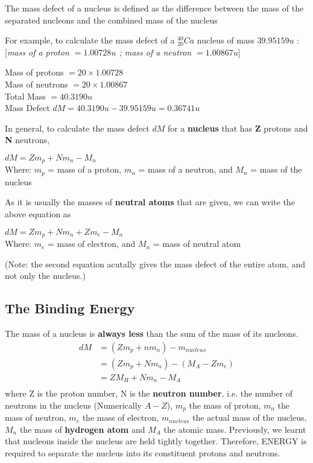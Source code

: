 \begin{defi}
The mass defect of a nucleus is defined as the difference between the mass of the separated nucleons and the combined mass of the nucleus
\end{defi}

For example, to calculate the mass defect of a $^{40}_{20}Ca$ nucleus of mass $39.95159u$ : [\textit{mass of a proton $= 1.00728u$ ; mass of a neutron $= 1.00867 u$}]

\begin{center}
Mass of protons $= 20 \times 1.00728$\\
Mass of neutrons $= 20 \times 1.00867$\\
Total Mass $=40.3190u$\\
Mass Defect $d M = 40.3190u - 39.95159u = 0.36741u$
\end{center}
In general, to calculate the mass defect $d M$ for a \textbf{nucleus} that has \textbf{Z} protons and \textbf{N} neutrons,
\begin{form}
$d M = Zm_p + Nm_n -M_n$\\
Where:
$m_p$ = mass of a proton, 
$m_n$ = mass of a neutron, and 
$M_n$ = mass of the nucleus
\end{form}

As it is usually the masses of \textbf{neutral atoms} that are given, we can write the above equation as
\begin{form}
$d M = Zm_p + Nm_n + Zm_e - M_n$\\
Where:
$m_e$ = mass of electron, and 
$M_n$ = mass of neutral atom
\end{form}

(Note: the second equation acutally gives the mass defect of the entire atom, and not only the nucleus.)

\subsection{The Binding Energy}
The mass of a nucleus is \textbf{always less} than the sum of the mass of its nucleons.
\begin{equation*}
\begin{split}
d M &= (Z m_p + n m_n) - m_{nucleus}\\
&= (Z m_p + N m_n) - (M_A - Z m_e)\\
&= Z M_H + N m_n - M_A\\
\end{split}
\end{equation*}
where Z is the proton number, N is the \textbf{neutron number}, i.e. the number  of neutrons in the nucleus (Numerically $A - Z$), $m_p$ the mass of proton, $m_n$ the mass of neutron, $m_e$ the mass of electron, $m_{nucleus}$ the actual mass of the nucleus, $M_n$ the mass of \textbf{hydrogen atom} and $M_A$ the atomic mass.
Previously, we learnt that nucleons inside the nucleus are held tightly together. Therefore, ENERGY is required to separate the nucleus into its constituent protons and neutrons.

